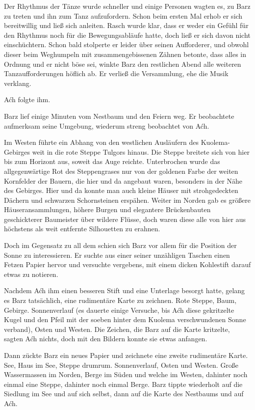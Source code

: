 Der Rhythmus der Tänze wurde schneller und einige Personen wagten es, zu Barz zu treten und ihn zum Tanz aufzufordern. Schon beim ersten Mal erhob er sich bereitwillig und ließ sich anleiten. Rasch wurde klar, dass er weder ein Gefühl für den Rhythmus noch für die Bewegungsabläufe hatte, doch ließ er sich davon nicht einschüchtern. Schon bald stolperte er leider über seinen Aufforderer, und obwohl dieser beim Weghumpeln mit zusammengebissenen Zähnen betonte, dass alles in Ordnung und er nicht böse sei, winkte Barz den restlichen Abend alle weiteren Tanzaufforderungen höflich ab. Er verließ die Versammlung, ehe die Musik verklang.

Aćh folgte ihm.

Barz lief einige Minuten vom Nestbaum und den Feiern weg. Er beobachtete aufmerksam seine Umgebung, wiederum streng beobachtet von Aćh.

Im Westen führte ein Abhang von den westlichen Ausläufern des Kuolema-Gebirges weit in die rote Steppe Tulgors hinaus. Die Steppe breitete sich von hier bis zum Horizont aus, soweit das Auge reichte. Unterbrochen wurde das allgegenwärtige Rot des Steppengrases nur von der goldenen Farbe der weiten Kornfelder der Bauern, die hier und da angebaut waren, besonders in der Nähe des Gebirges. Hier und da konnte man auch kleine Häuser mit strohgedeckten Dächern und schwarzen Schornsteinen erspähen. Weiter im Norden gab es größere Häuseransammlungen, höhere Burgen und elegantere Brückenbauten geschickterer Baumeister über wildere Flüsse, doch waren diese alle von hier aus höchstens als weit entfernte Silhouetten zu erahnen.

Doch im Gegensatz zu all dem schien sich Barz vor allem für die Position der Sonne zu interessieren. Er suchte aus einer seiner unzähligen Taschen einen Fetzen Papier hervor und versuchte vergebens, mit einem dicken Kohlestift darauf etwas zu notieren.

Nachdem Aćh ihm einen besseren Stift und eine Unterlage besorgt hatte, gelang es Barz tatsächlich, eine rudimentäre Karte zu zeichnen. Rote Steppe, Baum, Gebirge. Sonnenverlauf (es dauerte einige Versuche, bis Aćh diese gekritzelte Kugel und den Pfeil mit der soeben hinter dem Kuolema verschwundenen Sonne verband), Osten und Westen. Die Zeichen, die Barz auf die Karte kritzelte, sagten Aćh nichts, doch mit den Bildern konnte sie etwas anfangen.

Dann zückte Barz ein neues Papier und zeichnete eine zweite rudimentäre Karte. See, Haus im See, Steppe drumrum. Sonnenverlauf, Osten und Westen. Große Wassermassen im Norden, Berge im Süden und welche im Westen, dahinter noch einmal eine Steppe, dahinter noch einmal Berge. Barz tippte wiederholt auf die Siedlung im See und auf sich selbst, dann auf die Karte des Nestbaums und auf Aćh.

